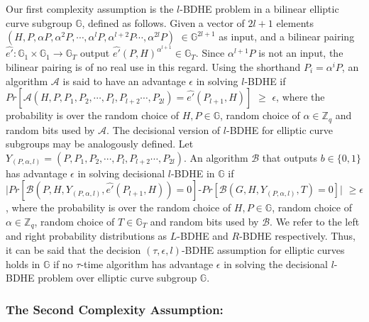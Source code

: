 Our first complexity assumption is the $l$-BDHE problem \cite{boneh2005collusion} in a bilinear elliptic curve subgroup $\mathbb{G}$, defined as follows. Given a vector of $2l+1$ elements $(H,P,\alpha P, {\alpha}^2P,\cdots,{\alpha}^{l}P,{\alpha}^{l+2}P\cdots,{\alpha}^{2l}P)$ $\in \mathbb{G}^{2l+1}$  as input, and a bilinear pairing $\hat{e'}:\mathbb{G}_1 \times \mathbb{G}_1\longrightarrow\mathbb{G}_T$ output $\hat{e'}(P,H)^{\alpha^{l+1}}\in\mathbb{G}_T$. Since ${\alpha}^{l+1}P$ is not an input, the bilinear pairing is of no real use in this regard. Using the shorthand $P_i = \alpha^{i}P$, an algorithm $\mathcal{A}$ is said to have an advantage $\epsilon$ in solving $l$-BDHE if \\$Pr[\mathcal{A}(H,P,P_1, P_2,\cdots,P_l,P_{l+2}\cdots,P_{2l}) =\hat{e'}(P_{l+1},H)]$ $\geq$ $\epsilon$, where the probability is over the random choice of $H,P \in \mathbb{G}$, random choice of $\alpha \in \mathbb{Z}_q$ and random bits used by $\mathcal{A}$. The decisional version of $l$-BDHE for elliptic curve subgroups may be analogously defined. Let $Y_{(P,\alpha,l)}=(P,P_1, P_2,\cdots,P_l,P_{l+2}\cdots,P_{2l})$. An algorithm $\mathcal{B}$ that outputs $b\in\{0,1\}$ has advantage $\epsilon$ in solving decisional $l$-BDHE in $\mathbb{G}$ if 
$|Pr[\mathcal{B}(P,H,Y_{(P,\alpha,l)},\hat{e'}(P_{l+1},H))=0]$-$Pr[\mathcal{B}(G,H,Y_{(P,\alpha,l)},T)=0]|$ $\geq \epsilon$,
where the probability is over the random choice of $H,P \in \mathbb{G}$, random choice of $\alpha \in \mathbb{Z}_q$, random choice of $T\in \mathbb{G}_T$ and random bits used by $\mathcal{B}$. We refer to the left and right probability distributions as $L$-BDHE and $R$-BDHE respectively. Thus, it can be said that the decision $(\tau,\epsilon,l)$-BDHE assumption for elliptic curves holds in $\mathbb{G}$ if no $\tau$-time algorithm has advantage $\epsilon$  in solving the decisional $l$-BDHE problem over elliptic curve subgroup $\mathbb{G}$. 

\subsubsection{The Second Complexity Assumption:} 
\label{subsubsec:asm_2}

